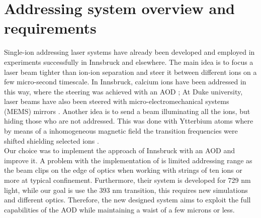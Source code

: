 \section{Addressing system overview and requirements}
\label{sec:addressing}
Single-ion addressing laser systems have already been developed and employed in experiments successfully in Innsbruck and elsewhere. The main idea is to focus a laser beam tighter than ion-ion separation and steer it between different ions on a few micro-second timescale. In Innsbruck, calcium ions have been addressed in this way, where the steering was achieved with an AOD \cite{addressing}; At Duke university, laser beams have also been steered with micro-electromechanical systems (MEMS) mirrors \cite{addressing3}. Another idea is to send a beam illuminating all the ions, but hiding those who are not addressed. This was done with Ytterbium atoms where by means of a inhomogeneous magnetic field the transition frequencies were shifted shielding selected ions \cite{addressing2}. \\
Our choice was to implement the approach of Innsbruck with an AOD and improve it. A problem with the implementation of \cite{addressing} is limited addressing range as the beam clips on the edge of optics when working with strings of ten ions or more at typical confinement. Furthermore, their system is developed for 729 nm light, while our goal is use the 393 nm transition, this requires new simulations and different optics. Therefore, the new designed system aims to exploit the full capabilities of the AOD while maintaining a waist of a few microns or less.
